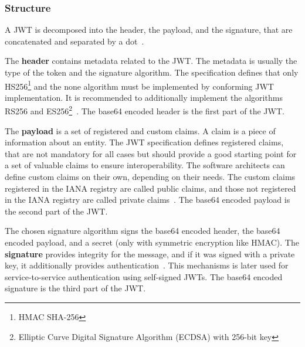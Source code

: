 \subsubsection{Structure}
A JWT is decomposed into the header, the payload, and the signature, that are concatenated and separated by a dot~\cite{jwtdocauth0}.

The \textbf{header} contains metadata related to the JWT. 
The metadata is usually the type of the token and the signature algorithm.
The specification defines that only HS256\footnote{HMAC SHA-256} and the none algorithm must be implemented by conforming JWT implementation.
It is recommended to additionally implement the algorithms RS256 and ES256\footnote{Elliptic Curve Digital Signature Algorithm (ECDSA) with 256-bit key}~\cite{jwtdocauth0, jwtrfc}.
The base64 encoded header is the first part of the JWT.

The \textbf{payload} is a set of registered and custom claims.
A claim is a piece of information about an entity.
The JWT specification defines registered claims, that are not mandatory for all cases but should provide a good starting point for a set of valuable claims to ensure interoperability.
The software architects can define custom claims on their own, depending on their needs.
The custom claims registered in the IANA registry are called public claims, and those not registered in the IANA registry are called private claims~\cite{jwtdocauth0, jwtrfc}.
The base64 encoded payload is the second part of the JWT.

The chosen signature algorithm signs the base64 encoded header, the base64 encoded payload, and a secret (only with symmetric encryption like HMAC).
The \textbf{signature} provides integrity for the message, and if it was signed with a private key, it additionally provides authentication~\cite{jwtdocauth0}.
This mechanisms is later used for service-to-service authentication using self-signed JWTs.
The base64 encoded signature is the third part of the JWT.

